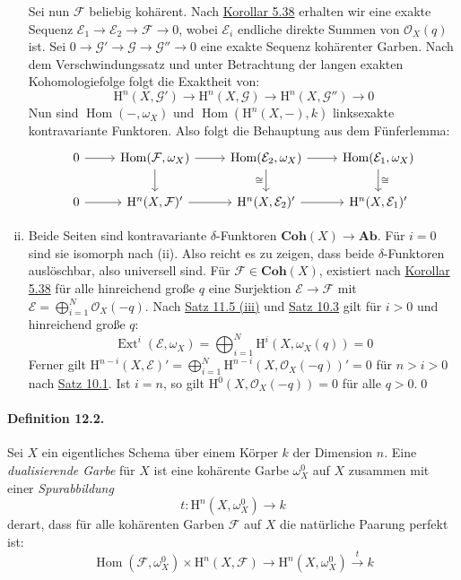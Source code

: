 \begin{enumerate}[(i)]
Sei nun $\mathcal{F}$ beliebig kohärent. Nach \hyperref[5.38]{Korollar 5.38} erhalten wir eine exakte Sequenz $\mathcal{E}_1\to\mathcal{E}_2\to\mathcal{F}\to 0$, wobei $\mathcal{E}_i$ endliche direkte Summen von $\mathcal{O}_X(q)$ ist. Sei $0\to\mathcal{G}'\to\mathcal{G}\to\mathcal{G}''\to 0$ eine exakte Sequenz kohärenter Garben. Nach dem Verschwindungssatz und unter Betrachtung der langen exakten Kohomologiefolge folgt die Exaktheit von:
\[\mathrm{H}^n(X,\mathcal{G}')\longrightarrow\mathrm{H}^n(X,\mathcal{G})\longrightarrow\mathrm{H}^n(X,\mathcal{G}'')\longrightarrow 0\]
Nun sind $\operatorname{Hom}(-,\omega_X)$ und $\operatorname{Hom}(\mathrm{H}^n(X,-),k)$ linksexakte kontravariante Funktoren. Also folgt die Behauptung aus dem Fünferlemma:
\[\begin{tikzcd}
0\rar & \operatorname{Hom}(\mathcal{F},\omega_X) \dar\rar& \operatorname{Hom}(\mathcal{E}_2,\omega_X) \rar\dar["\cong"']& \operatorname{Hom}(\mathcal{E}_1,\omega_X)\dar["\cong"]\\
0 \rar& \mathrm{H}^n(X,\mathcal{F})'\rar & \mathrm{H}^n(X,\mathcal{E}_2)'\rar & \mathrm{H}^n(X,\mathcal{E}_1)'
\end{tikzcd}\]
\item Beide Seiten sind kontravariante $\delta$-Funktoren $\mathbf{Coh}(X)\to\mathbf{Ab}$. Für $i=0$ sind sie isomorph nach (ii). Also reicht es zu zeigen, dass beide $\delta$-Funktoren auslöschbar, also universell sind. Für $\mathcal{F}\in\mathbf{Coh}(X)$, existiert nach \hyperref[5.38]{Korollar 5.38} für alle hinreichend große $q$ eine Surjektion $\mathcal{E}\to\mathcal{F}$ mit $\mathcal{E}=\bigoplus_{i=1}^N\mathcal{O}_X(-q)$. Nach \hyperref[11.5]{Satz 11.5 (iii)} und \hyperref[10.3]{Satz 10.3} gilt für $i>0$ und hinreichend große $q$:
\[\operatorname{Ext}^i(\mathcal{E},\omega_X) =\bigoplus_{i=1}^N\mathrm{H}^i(X,\omega_X(q))=0 \]
Ferner gilt $\mathrm{H}^{n-i}(X,\mathcal{E})'=\bigoplus_{i=1}^N\mathrm{H}^{n-i}(X,\mathcal{O}_X(-q))'=0$ für $n>i>0$ nach \hyperref[10.1]{Satz 10.1}. Ist $i=n$, so gilt $\mathrm{H}^0(X,\mathcal{O}_X(-q))=0$ für alle $q>0$.\qed
\end{enumerate}

\paragraph{Definition 12.2.}\label{12.2} Sei $X$ ein eigentliches Schema über einem Körper $k$ der Dimension $n$. Eine \textit{dualisierende Garbe} für $X$ ist eine kohärente Garbe $\omega_X^0$ auf $X$ zusammen mit einer \textit{Spurabbildung}
\[t:\mathrm{H}^n(X,\omega_X^0)\to k \]
derart, dass für alle kohärenten Garben $\mathcal{F}$ auf $X$ die natürliche Paarung perfekt ist:
\[\operatorname{Hom}(\mathcal{F},\omega_X^0) \times\mathrm{H}^n(X,\mathcal{F}) \longrightarrow\mathrm{H}^n(X,\omega_X^0)\stackrel{t}{\longrightarrow}k \]

